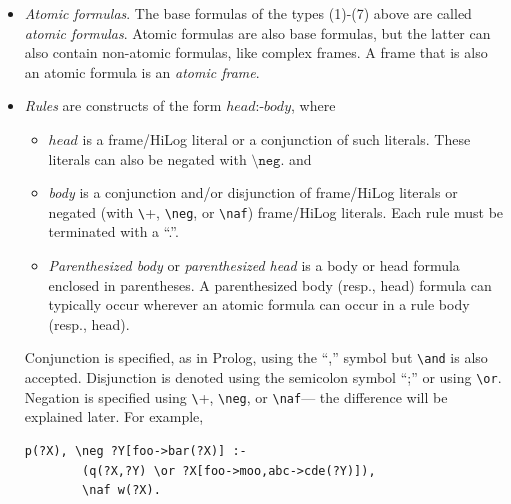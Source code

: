 \documentclass[11pt]{article}
\newcommand{\bs}{\textbackslash}
\newcommand{\PLGNAF}{\mbox{\texttt{\bs}+}\xspace}
\newcommand{\RULELOGNAF}{{\texttt{{\bs}naf}}\xspace}
\newcommand{\RULELOGNEG}{{\texttt{{\bs}neg}}\xspace}
\begin{document}
\begin{itemize}
  Furthermore, in rule bodies and queries,
  frame attribute notation combines with the binary operators
  \texttt{=}, \texttt{\bs{}=}, \texttt{!=}, \texttt{==}, \texttt{\bs{}==},
  \texttt{=\bs=}, \texttt{=:=}, \texttt{!==}, \texttt{:=:},
  \texttt{\bs{}is}, \texttt{>}, \texttt{<}, \texttt{=<}, \texttt{>=},
  \texttt{@<}, \texttt{@>}, \texttt{@=<}, \texttt{@>=}, \texttt{$\sim$},
  \texttt{!$\sim$}, \texttt{\bs{}in}, \texttt{\bs{}subset},
  \texttt{\bs{}sublist{}}.   
  These operators will be introduced as we go, many in
  Section~\ref{sec-arith-expr}, but here is an example of a query where
  some of these operators are rolled into a frame:
\begin{verbatim}
 ?- John[age->?A>30, children->?C != Bob, salary->?X \is 200*7+5000,
         phone->?P \in ['111-222-3456','123-456-7890']].  
\end{verbatim}
  This is a shorthand for
\begin{verbatim}
 ?- John[age->?A,children->?C,salary->?X], ?A>30, ?C!=Bob, ?X \is 200*7+5000.
\end{verbatim}

\item \emph{Atomic formulas}. The base formulas of the types (1)-(7) above
  are called \emph{atomic formulas}.  Atomic formulas are also base formulas,
  but the latter can also contain non-atomic formulas, like complex frames.
  A frame that is also an atomic formula is an \emph{atomic frame}.  
  
\item \emph{Rules} are constructs of the form $head \texttt{:-} body$, where
  \begin{itemize}
  \item $head$ is a frame/HiLog literal or a conjunction of such literals.
    These literals can also be negated with $\RULELOGNEG$.
    and
  \item \emph{body} is a conjunction and/or disjunction
    of frame/HiLog literals or negated (with \PLGNAF, \RULELOGNEG, or
    \RULELOGNAF) frame/HiLog literals.
  Each rule must be terminated with a ``.''.
  \item \emph{Parenthesized body} or \emph{parenthesized head}     
    is a body or head formula enclosed in parentheses.
    A parenthesized body (resp., head) formula can typically occur wherever
    an atomic formula can occur in a rule body (resp., head).
  \end{itemize}
  Conjunction is specified, as in Prolog, using the ``,'' symbol but
  \texttt{\bs{}and} is also accepted. Disjunction is denoted
  using the semicolon symbol ``;'' or using \texttt{\bs{}or}.
  Negation is specified using \PLGNAF, \RULELOGNEG,
  or \RULELOGNAF --- the difference will be explained later.
  For example,
\begin{verbatim}
p(?X), \neg ?Y[foo->bar(?X)] :-
        (q(?X,?Y) \or ?X[foo->moo,abc->cde(?Y)]),
        \naf w(?X).
\end{verbatim}


\end{itemize}
\end{document}
